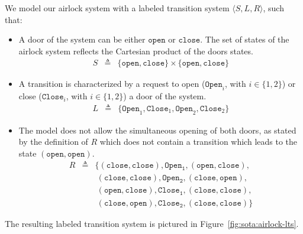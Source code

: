 \begin{example}
  \label{example:sota:airlocklts}

  We model our airlock system with a labeled transition system
  \( \langle S, L, R \rangle \), such that:

  \begin{itemize}
  \item A door of the system can be either \( \mathtt{open} \) or
    \( \mathtt{close} \).
    The set of states of the airlock system reflects the Cartesian product of
    the doors states.
    \[
      \begin{array}{rcl}
        S & \triangleq & \{ \mathtt{open}, \mathtt{close} \} \times \{ \mathtt{open},
                         \mathtt{close} \}
      \end{array}
    \]
  \item A transition is characterized by a request to open
    (\( \mathtt{Open}_i\), with \( i \in \{1, 2\} \)) or close
    (\( \mathtt{Close}_i \), with \( i \in \{1, 2\} \)) a door of the system.
    \[
      \begin{array}{rcl}
        L & \triangleq & \{ \mathtt{Open}_1, \mathtt{Close}_1, \mathtt{Open}_2,
                         \mathtt{Close}_2 \}
      \end{array}
    \]
  \item The model does not allow the simultaneous opening of both doors, as
    stated by the definition of \( R \) which does not contain a transition
    which leads to the state \( (\mathtt{open}, \mathtt{open}) \).
    \[
      \begin{array}{rcl}
        R & \triangleq & \{ (\mathtt{close}, \mathtt{close}), \mathtt{Open_1},
                         (\mathtt{open}, \mathtt{close}), \\
          & & \ (\mathtt{close}, \mathtt{close}), \mathtt{Open_2},
              (\mathtt{close}, \mathtt{open}), \\
          & & \ (\mathtt{open}, \mathtt{close}), \mathtt{Close_1},
              (\mathtt{close}, \mathtt{close}), \\
          & & \ (\mathtt{close}, \mathtt{open}), \mathtt{Close_2},
              (\mathtt{close}, \mathtt{close}) \}
      \end{array}
    \]
  \end{itemize}

  The resulting labeled transition system is pictured in
  Figure~\ref{fig:sota:airlock-lts}.
\end{example}

